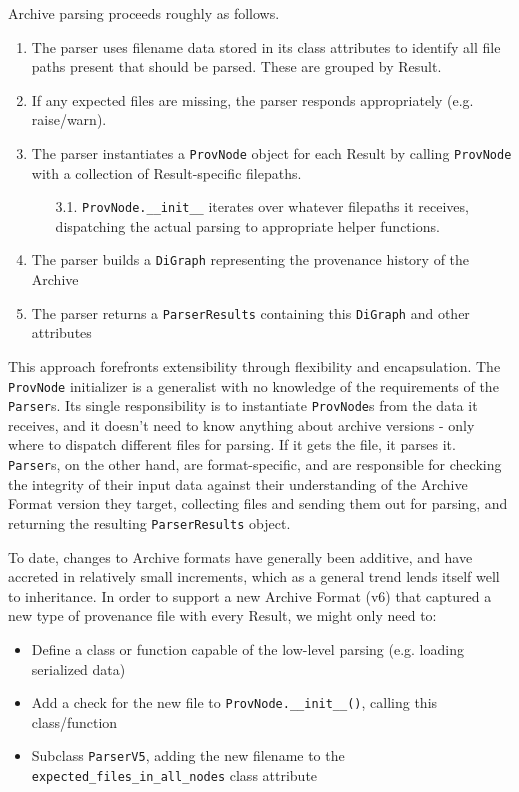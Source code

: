 Archive parsing proceeds roughly as follows.
\begin{enumerate}
    \item The parser uses filename data stored in its class attributes to
        identify all file paths present that should be parsed. These are grouped by
        Result.
    \item If any expected files are missing, the parser responds appropriately (e.g. raise/warn).
    \item The parser instantiates a \texttt{ProvNode} object for each Result by
        calling \texttt{ProvNode} with a collection of Result-specific filepaths.
    \begin{enumerate}
        \item[3.1.]\texttt{ProvNode.\_\_init\_\_} iterates over whatever
            filepaths it receives, dispatching the actual parsing to appropriate
            helper functions. 
    \end{enumerate}
    \item The parser builds a \texttt{DiGraph} representing the provenance
        history of the Archive
    \item The parser returns a \texttt{ParserResults} containing this
        \texttt{DiGraph} and other attributes
\end{enumerate}

This approach forefronts extensibility through flexibility and encapsulation.
The \texttt{ProvNode} initializer is a generalist with no knowledge of the requirements
of the \texttt{Parser}s. Its single responsibility is to instantiate \texttt{ProvNode}s from the
data it receives, and it doesn’t need to know anything about archive versions -
only where to dispatch different files for parsing. If it gets the file, it
parses it. \texttt{Parser}s, on the other hand, are format-specific, and are responsible
for checking the integrity of their input data against their understanding of
the Archive Format version they target, collecting files and sending them out
for parsing, and returning the resulting \texttt{ParserResults} object.

To date, changes to Archive formats have generally been additive, and have
accreted in relatively small increments, which as a general trend lends itself
well to inheritance. In order to support a new Archive Format (v6) that captured
a new type of provenance file with every Result, we might only need to:
\begin{itemize}
    \item Define a class or function capable of the low-level parsing (e.g. loading serialized data)
    \item Add a check for the new file to \texttt{ProvNode.\_\_init\_\_()}, calling this class/function
    \item Subclass \texttt{ParserV5}, adding the new filename to the
        \texttt{expected\_files\_in\_all\_nodes} class attribute
\end{itemize}

